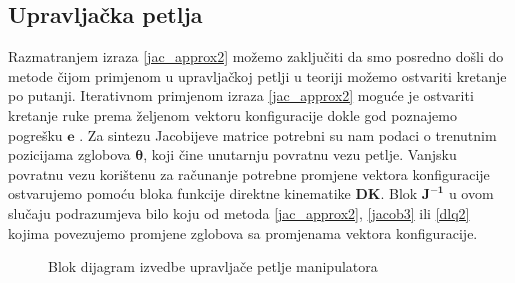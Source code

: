 \documentclass[times, utf8, diplomski, numeric]{fer}
\begin{document}
\subsection{Upravljačka petlja}\label{kin_upr}
Razmatranjem izraza \ref{jac_approx2} možemo zaključiti da smo posredno došli do metode čijom primjenom u upravljačkoj petlji u teoriji možemo ostvariti kretanje po putanji. 
Iterativnom primjenom izraza \ref{jac_approx2} moguće je ostvariti kretanje ruke prema željenom vektoru konfiguracije dokle god poznajemo pogrešku $\mathbf{e}$ . 
Za sintezu Jacobijeve matrice potrebni su nam podaci o trenutnim pozicijama zglobova $\bm{\theta}$, koji čine unutarnju povratnu vezu petlje.
Vanjsku povratnu vezu korištenu za računanje potrebne promjene vektora konfiguracije ostvarujemo pomoću bloka funkcije direktne kinematike \textbf{DK}.
Blok $\mathbf{J^{-1}}$ u ovom slučaju podrazumjeva bilo koju od metoda \ref{jac_approx2}, \ref{jacob3} ili \ref{dlq2} kojima povezujemo promjene zglobova sa promjenama vektora konfiguracije.
\begin{figure}[!h]
\centering
{}
\caption{Blok dijagram izvedbe upravljače petlje manipulatora} \label{petlja}
\end{figure}
\end{document}
